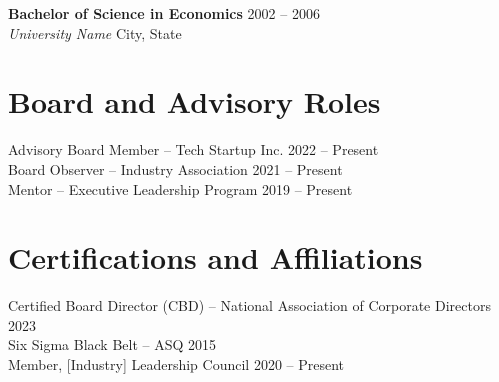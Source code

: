 \documentclass[11pt,a4paper]{article}
\newcommand{\entry}[4]{%
    \noindent\textbf{#1} \hfill {\small #2} \\
    \textit{#3} \hfill {\small #4}%
}
\begin{document}
\vspace{0.3em}

\entry{Bachelor of Science in Economics}{2002 -- 2006}{University Name}{City, State}

\section{Board and Advisory Roles}

\noindent Advisory Board Member -- Tech Startup Inc. \hfill 2022 -- Present \\
Board Observer -- Industry Association \hfill 2021 -- Present \\
Mentor -- Executive Leadership Program \hfill 2019 -- Present

\section{Certifications and Affiliations}

\noindent Certified Board Director (CBD) -- National Association of Corporate Directors \hfill 2023 \\
Six Sigma Black Belt -- ASQ \hfill 2015 \\
Member, [Industry] Leadership Council \hfill 2020 -- Present
\end{document}
